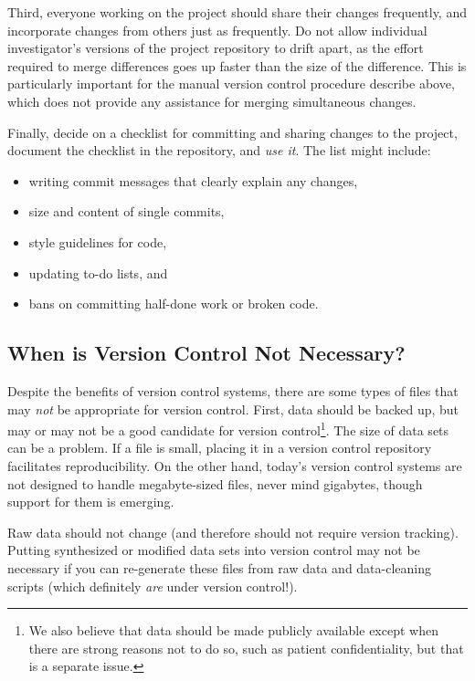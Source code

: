 \documentclass[10pt]{article}
\begin{document}
Third, everyone working on the project should share their changes
frequently, and incorporate changes from others just as frequently. Do
not allow individual investigator's versions of the project repository
to drift apart, as the effort required to merge differences goes up
faster than the size of the difference. This is particularly important
for the manual version control procedure describe above, which does not
provide any assistance for merging simultaneous changes.

Finally, decide on a checklist for committing and sharing changes to the
project, document the checklist in the repository, and \emph{use it}.
The list might include:

\begin{itemize}
\item
  writing commit messages that clearly explain any changes,
\item
  size and content of single commits,
\item
  style guidelines for code,
\item
  updating to-do lists, and
\item
  bans on committing half-done work or broken code.
\end{itemize}

\subsection*{When is Version Control Not Necessary?}

Despite the benefits of version control systems, there are some types
of files that may \emph{not} be appropriate for version
control. First, data should be backed up, but may or may not be a good
candidate for version control\footnote{We also believe that data
  should be made publicly available except when there are strong
  reasons not to do so, such as patient confidentiality, but that is a
  separate issue.}. The size of data sets can be a problem. If a file
is small, placing it in a version control repository facilitates
reproducibility. On the other hand, today's version control systems
are not designed to handle megabyte-sized files, never mind gigabytes,
though support for them is emerging.

Raw data should not change (and therefore should not require version
tracking). Putting synthesized or modified data sets into version
control may not be necessary if you can re-generate these files from raw
data and data-cleaning scripts (which definitely \emph{are} under
version control!).
\end{document}
